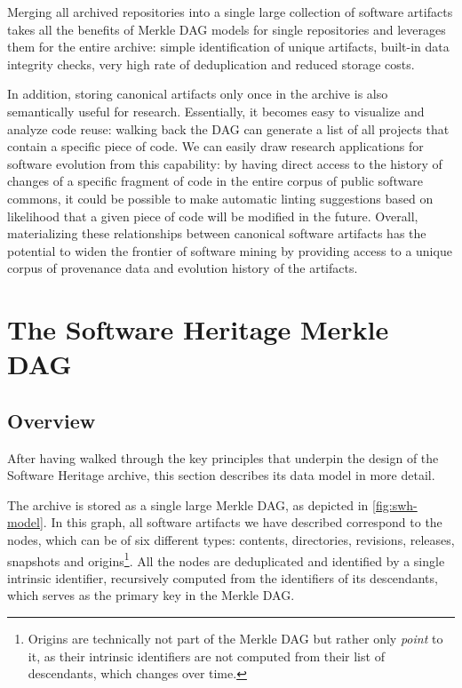 Merging all archived repositories into a single large collection of software
artifacts takes all the benefits of Merkle \gls{DAG} models for single
repositories and leverages them for the entire archive: simple identification
of unique artifacts, built-in data integrity checks, very high rate of
deduplication and reduced storage costs.

In addition, storing canonical artifacts only once in the archive is also
semantically useful for research. Essentially, it becomes easy to visualize
and analyze code reuse: walking back the \gls{DAG} can generate a list of all
projects that contain a specific piece of code.
We can easily draw research applications for software evolution from this
capability: by having direct access to the history of changes of a specific
fragment of code in the entire corpus of public software commons, it could be
possible to make automatic linting suggestions based on likelihood that a given
piece of code will be modified in the future. Overall, materializing these
relationships between canonical software artifacts has the potential to widen
the frontier of software mining by providing access to a unique corpus of
provenance data and evolution history of the artifacts.


\section{The Software Heritage Merkle DAG}

\subsection{Overview}

After having walked through the key principles that underpin the design of the
Software Heritage archive, this section describes its data model in more
detail.

The archive is stored as a single large Merkle \gls{DAG}, as depicted
in \cref{fig:swh-model}. In this graph, all software artifacts we have
described correspond to the nodes, which can be of six different types:
contents, directories, revisions, releases, snapshots and
origins\footnote{Origins are technically not part of the Merkle DAG but rather
only \emph{point} to it, as their intrinsic identifiers are not computed from
their list of descendants, which changes over time.}.
All the nodes are deduplicated and identified by a single intrinsic
identifier, recursively computed from the identifiers of its descendants, which
serves as the primary key in the Merkle \gls{DAG}.


